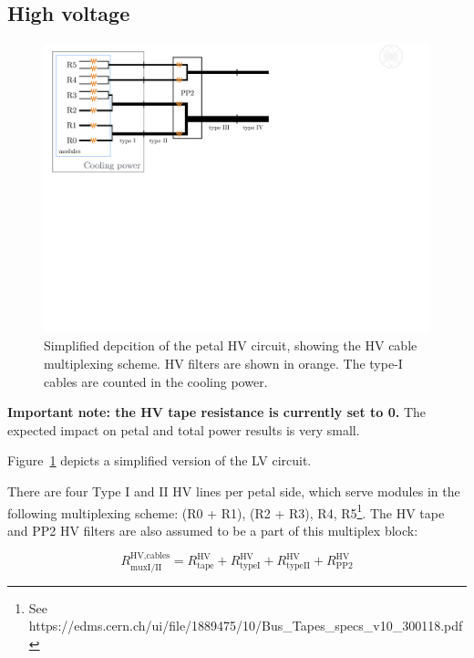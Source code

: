 \subsection{High voltage}


\begin{figure}[ht!]
\begin{center}
\includegraphics[width=0.60\linewidth]{figures/HV_cartoon.pdf}
\end{center}
\caption{Simplified depcition of the petal HV circuit, showing the HV cable multiplexing scheme. HV filters are shown
in orange. The type-I cables are counted in the cooling power.}
\label{hv_circuit}
\end{figure}

{ \bf Important note: the HV tape resistance is currently set to 0. } The expected impact on petal
and total power results is very small.

Figure~\ref{hv_circuit} depicts a simplified version of the LV circuit.

There are four Type I and II HV lines per petal side, which serve modules in the following multiplexing
scheme: (R0 + R1), (R2 + R3), R4, R5\footnote{ See
https://edms.cern.ch/ui/file/1889475/10/Bus\_Tapes\_specs\_v10\_300118.pdf
}. The HV tape and PP2 HV filters are also assumed to be a part of this multiplex block:

\def\rhvmuxI{R^\text{HV,cables}_\text{muxI/II}}
\def\rhvmuxIII{R^\text{HV,cables}_\text{muxIII/IV}}
\def\rtape{R^\text{HV}_\text{tape}}
\def\rtypeI{R^\text{HV}_\text{typeI}}
\def\rtypeII{R^\text{HV}_\text{typeII}}
\def\rtypeIII{R^\text{HV}_\text{typeIII}}
\def\rtypeIV{R^\text{HV}_\text{typeIV}}
\[
\rhvmuxI = \rtape + \rtypeI + \rtypeII + R^\text{HV}_\text{PP2}
\]

